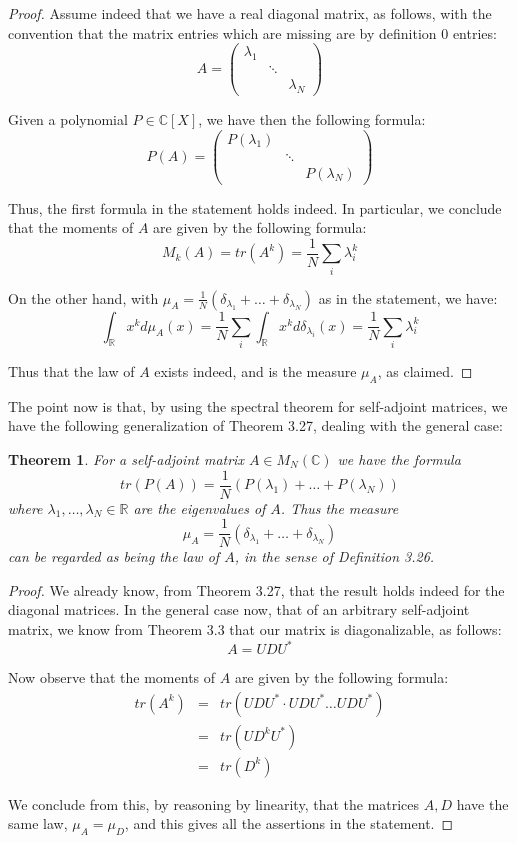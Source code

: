 \documentclass[12pt]{amsbook}
\newtheorem{theorem}{Theorem}[chapter]
\begin{document}
\begin{proof}
Assume indeed that we have a real diagonal matrix, as follows, with the convention that the matrix entries which are missing are by definition 0 entries:
$$A=\begin{pmatrix}
\lambda_1\\
&\ddots\\
&&\lambda_N\end{pmatrix}$$

Given a polynomial $P\in\mathbb C[X]$, we have then the following formula:
$$P(A)=\begin{pmatrix}
P(\lambda_1)\\
&\ddots\\
&&P(\lambda_N)\end{pmatrix}$$

Thus, the first formula in the statement holds indeed. In particular, we conclude that the moments of $A$ are given by the following formula:
$$M_k(A)=tr(A^k)=\frac{1}{N}\sum_i\lambda_i^k$$

On the other hand, with $\mu_A=\frac{1}{N}(\delta_{\lambda_1}+\ldots+\delta_{\lambda_N})$ as in the statement, we have:
$$\int_\mathbb Rx^kd\mu_A(x)
=\frac{1}{N}\sum_i\int_\mathbb Rx^kd\delta_{\lambda_i}(x)
=\frac{1}{N}\sum_i\lambda_i^k$$

Thus that the law of $A$ exists indeed, and is the measure $\mu_A$, as claimed.
\end{proof}

The point now is that, by using the spectral theorem for self-adjoint matrices, we have the following generalization of Theorem 3.27, dealing with the general case:

\begin{theorem}
For a self-adjoint matrix $A\in M_N(\mathbb C)$ we have the formula
$$tr(P(A))=\frac{1}{N}(P(\lambda_1)+\ldots+P(\lambda_N))$$
where $\lambda_1,\ldots,\lambda_N\in\mathbb R$ are the eigenvalues of $A$. Thus the measure
$$\mu_A=\frac{1}{N}(\delta_{\lambda_1}+\ldots+\delta_{\lambda_N})$$
can be regarded as being the law of $A$, in the sense of Definition 3.26.
\end{theorem}

\begin{proof}
We already know, from Theorem 3.27, that the result holds indeed for the diagonal matrices. In the general case now, that of an arbitrary self-adjoint matrix, we know from Theorem 3.3 that our matrix is diagonalizable, as follows:
$$A=UDU^*$$

Now observe that the moments of $A$ are given by the following formula:
\begin{eqnarray*}
tr(A^k)
&=&tr(UDU^*\cdot UDU^*\ldots UDU^*)\\
&=&tr(UD^kU^*)\\
&=&tr(D^k)
\end{eqnarray*}

We conclude from this, by reasoning by linearity, that the matrices $A,D$ have the same law, $\mu_A=\mu_D$, and this gives all the assertions in the statement.
\end{proof}
\end{document}
